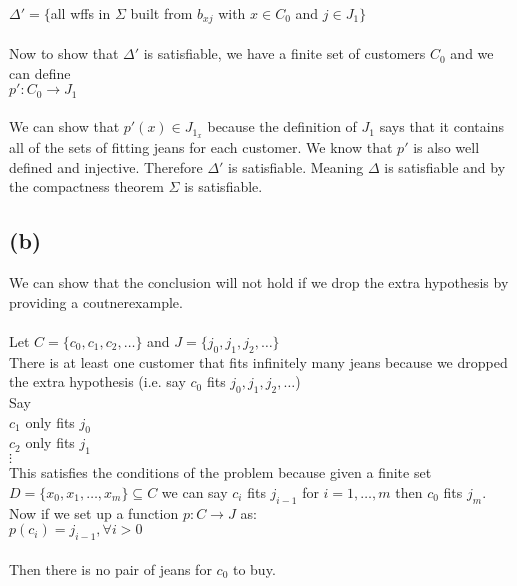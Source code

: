 \documentclass[11pt, a4paper, oneside]{article}
\begin{document}
$\Delta' = \{$all wffs in $\Sigma$ built from $b_{xj}$ with $x \in C_0$ and $j \in J_1\}$\\
\\
Now to show that $\Delta'$ is satisfiable, we have a finite set of customers $C_0$ and we can define\\

$p': C_0 \rightarrow J_1$\\
\\
We can show that $p'(x) \in J_{1_x}$ because the definition of $J_1$ says that it contains all of the sets of 
fitting jeans for each customer. We know that $p'$ is also well defined and injective. Therefore $\Delta'$ is
satisfiable. Meaning $\Delta$ is satisfiable and by the compactness theorem $\Sigma$ is satisfiable.
\subsection*{(b)}
We can show that the conclusion will not hold if we drop the extra hypothesis by providing a coutnerexample.\\
\\
Let $C = \{c_0, c_1, c_2, \ldots \}$ and $J = \{j_0, j_1, j_2, \ldots \}$\\
There is at least one customer that fits infinitely many jeans because we dropped the extra hypothesis (i.e. say
$c_0$ fits $j_0, j_1, j_2, \ldots$)\\
Say\\
$c_1$ only fits $j_0$\\
$c_2$ only fits $j_1$\\
$\vdots$\\
This satisfies the conditions of the problem because given a finite set $D = \{x_0, x_1, \ldots, x_m \} \subseteq
C$ we can say $c_i$ fits $j_{i-1}$ for $i = 1, \ldots, m$ then $c_0$ fits $j_m$.\\
Now if we set up a function $p: C \rightarrow J$ as:\\

$p(c_i) = j_{i-1}, \forall i > 0$\\
\\
Then there is no pair of jeans for $c_0$ to buy.
\end{document}
